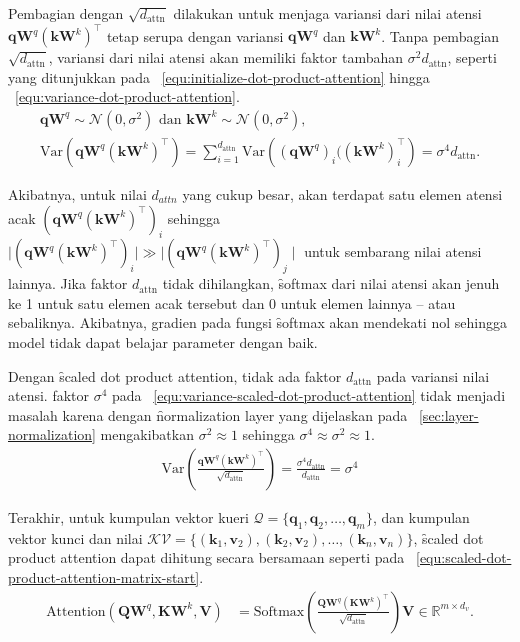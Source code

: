 	Pembagian dengan $\sqrt{d_{\text{attn}}}$ dilakukan untuk menjaga variansi dari nilai atensi $\mathbf{q} \mathbf{W}^q (\mathbf{k} \mathbf{W}^k)^{\top}$ tetap serupa dengan variansi $\mathbf{qW}^q$ dan $\mathbf{kW}^k$. Tanpa pembagian $\sqrt{d_\text{{attn}}}$, variansi dari nilai atensi akan memiliki faktor tambahan $\sigma^2 d_{\text{attn}}$, seperti yang ditunjukkan pada \equ~\ref{equ:initialize-dot-product-attention} hingga \equ~\ref{equ:variance-dot-product-attention}.
	\begin{align}
		\label{equ:initialize-dot-product-attention}
		\mathbf{qW}^q \sim \mathcal{N}(0, \sigma^2) \text{ dan } \mathbf{kW}^k \sim \mathcal{N}(0, \sigma^2), \\
		\label{equ:variance-dot-product-attention}
		\text{Var}(\mathbf{qW}^q (\mathbf{kW}^k)^{\top}) = \sum_{i=1}^{d_{\text{attn}}} \text{Var}\left((\mathbf{qW}^q)_i ((\mathbf{kW}^k)^{\top}_i\right) = \sigma^4 d_{\text{attn}}.
	\end{align}
	
	Akibatnya, untuk nilai $d_{attn}$ yang cukup besar, akan terdapat satu elemen atensi acak $(\mathbf{qW}^q (\mathbf{kW}^k)^{\top})_i$ sehingga $\mid (\mathbf{qW}^q (\mathbf{kW}^k)^{\top})_i\mid \gg \mid(\mathbf{qW}^q (\mathbf{kW}^k)^{\top})_j\mid$ untuk sembarang nilai atensi lainnya. Jika faktor $d_{\text{attn}}$ tidak dihilangkan, \f{softmax} dari nilai atensi akan jenuh ke 1 untuk satu elemen acak tersebut dan 0 untuk elemen lainnya -- atau sebaliknya. Akibatnya, gradien pada fungsi \f{softmax} akan mendekati nol sehingga model tidak dapat belajar parameter dengan baik. 

	Dengan \f{scaled dot product attention}, tidak ada faktor $d_{\text{attn}}$ pada variansi nilai atensi. faktor $\sigma^4$ pada \equ~\ref{equ:variance-scaled-dot-product-attention} tidak menjadi masalah karena dengan \f{normalization layer} yang dijelaskan pada \sect~\ref{sec:layer-normalization} mengakibatkan $\sigma^2 \approx 1$ sehingga $\sigma^4 \approx \sigma^2 \approx 1$.
	\begin{align}
		\label{equ:variance-scaled-dot-product-attention}
		\text{Var}\left(\frac{\mathbf{qW}^q (\mathbf{kW}^k)^{\top}}{\sqrt{{d_{\text{attn}}}}}\right) = \frac{\sigma^4 d_{\text{attn}}}{d_{\text{attn}}} = \sigma^4
	\end{align}

	Terakhir, untuk kumpulan vektor kueri $\mathcal{Q} = \{\mathbf{q}_1, \mathbf{q}_2, \dots, \mathbf{q}_m\}$, dan kumpulan vektor kunci dan nilai $\mathcal{KV} = \{(\mathbf{k}_1, \mathbf{v}_2), (\mathbf{k}_2, \mathbf{v}_2), \dots, (\mathbf{k}_n, \mathbf{v}_n)\}$, \f{scaled dot product attention} dapat dihitung secara bersamaan seperti pada \equ~\ref{equ:scaled-dot-product-attention-matrix-start}.
	\begin{align}
	\label{equ:scaled-dot-product-attention-matrix-start}
	\text{Attention}(\mathbf{QW}^q, \mathbf{KW}^k, \mathbf{V}) &= \text{Softmax}( \frac{\mathbf{QW}^q (\mathbf{KW}^k)^{\top}}{\sqrt{d_{\text{attn}}}}) \mathbf{V} \in \mathbb{R}^{m \times d_{v}}.
	\end{align}

